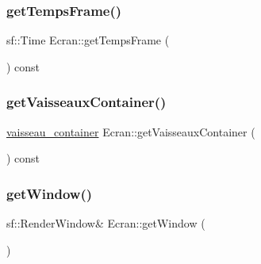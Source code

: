 \mbox{\label{class_ecran_a7fc62bede7a95d972326151446f4e75c}} 
\subsubsection{\texorpdfstring{get\+Temps\+Frame()}{getTempsFrame()}}
{\footnotesize\ttfamily sf\+::\+Time Ecran\+::get\+Temps\+Frame (\begin{DoxyParamCaption}{ }\end{DoxyParamCaption}) const\hspace{0.3cm}{\ttfamily [inline]}}

\mbox{\label{class_ecran_a596618c9e9a039fef504c9dcc9c2addf}} 
\subsubsection{\texorpdfstring{get\+Vaisseaux\+Container()}{getVaisseauxContainer()}}
{\footnotesize\ttfamily \mbox{\hyperlink{def__type_8h_ad123ed7c93f42c8dd68e4af28b16b639}{vaisseau\+\_\+container}} Ecran\+::get\+Vaisseaux\+Container (\begin{DoxyParamCaption}{ }\end{DoxyParamCaption}) const\hspace{0.3cm}{\ttfamily [inline]}}

\mbox{\label{class_ecran_a735fe022858b847a019bf1a69e117f1a}} 
\subsubsection{\texorpdfstring{get\+Window()}{getWindow()}}
{\footnotesize\ttfamily sf\+::\+Render\+Window\& Ecran\+::get\+Window (\begin{DoxyParamCaption}{ }\end{DoxyParamCaption})\hspace{0.3cm}{\ttfamily [inline]}}

\mbox{\label{class_ecran_a8ca7e9677252fef3a5e6aee60d27a9e3}} 
